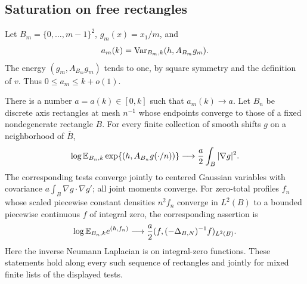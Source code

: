 \subsection{Saturation on free rectangles}

Let $B_m=\{0,\ldots,m-1\}^2$, $g_m(x)=x_1/m$, and
\begin{equation}\label{st:am}
 a_m(k)=\operatorname{Var}_{B_m,k}(h,A_{B_m}g_m).
\end{equation}
The energy $(g_m,A_{B_m}g_m)$ tends to one, by square symmetry and the
definition of $v$. Thus $0\le a_m\le k+o(1)$.

\begin{theorem}\label{st:free-rectangle-limit}
There is a number $a=a(k)\in[0,k]$ such that $a_m(k)\to a$.
Let $B_n$ be discrete axis rectangles at mesh $n^{-1}$ whose endpoints
converge to those of a fixed nondegenerate rectangle $B$. For every finite
collection of smooth shifts $g$ on a neighborhood of $\overline B$,
\begin{equation}\label{st:rectangle-laplace}
 \log\mathbb E_{B_n,k}\exp\{(h,A_{B_n}g(\cdot/n))\}
 \longrightarrow \frac a2\int_B|\nabla g|^2.
\end{equation}
The corresponding tests converge jointly to centered Gaussian variables
with covariance $a\int_B\nabla g\cdot\nabla g'$; all joint moments converge.
For zero-total profiles $f_n$ whose scaled piecewise constant densities
$n^2f_n$ converge in $L^2(B)$ to a bounded piecewise continuous $f$ of
integral zero, the corresponding assertion is
\begin{equation}\label{st:rectangle-smear}
 \log\mathbb E_{B_n,k}e^{(h,f_n)}
 \longrightarrow \frac a2(f,(-\Delta_{B,N})^{-1}f)_{L^2(B)}.
\end{equation}
Here the inverse Neumann Laplacian is on integral-zero functions. These
statements hold along every such sequence of rectangles and jointly for
mixed finite lists of the displayed tests.
\end{theorem}

